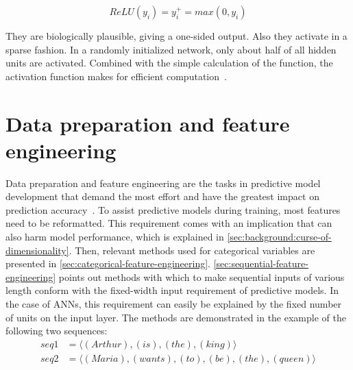 $$ReLU(y_i) = y_i^+ = max(0, y_i)$$

They are biologically plausible, giving a one-sided output.
Also they activate in a sparse fashion. In a randomly initialized network, only about half of all hidden units are activated.
Combined with the simple calculation of the function, the activation function makes for efficient computation~\cite{glorot2011deep}.

\section{Data preparation and feature engineering}
\label{sec:background:feature-engineering}
Data preparation and feature engineering are the tasks in predictive model development that demand the most effort and have the greatest impact on prediction accuracy~\cite{kuhn2013applied}. To assist predictive models during training, most features need to be reformatted. This requirement comes with an implication that can also harm model performance, which is explained in \autoref{sec:background:curse-of-dimensionality}.
Then, relevant methods used for categorical variables are presented in \autoref{sec:categorical-feature-engineering}. \autoref{sec:sequential-feature-engineering} points out methods with which to make sequential inputs of various length conform with the fixed-width input requirement of predictive models. In the case of ANNs, this requirement can easily be explained by the fixed number of units on the input layer. The methods are demonstrated in the example of the following two sequences:
\begin{equation*}
    \begin{split}
        seq1 &= \langle(Arthur),(is),(the),(king)\rangle\\
        seq2 &= \langle(Maria),(wants),(to),(be),(the),(queen)\rangle
    \end{split}
\end{equation*}

